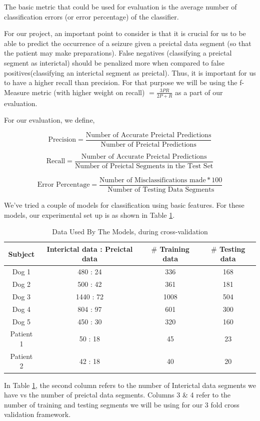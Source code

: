 \documentclass[a4paper]{article}
\begin{document}
The basic metric that could be used for evaluation is the average number of classification errors (or error percentage) of the classifier.

For our project, an important point to consider is that it is crucial for us to be able to predict the occurrence of a seizure given a preictal data segment (so that the patient may make preparations). False negatives (classifying a preictal segment as interictal) should be penalized more when compared to false positives(classifying an interictal segment as preictal). Thus, it is important for us to have a higher recall than precision. For that purpose we will be using the f-Measure metric (with higher weight on recall) $ = \frac{3PR}{2P + R} $ as a part of our evaluation.

For our evaluation, we define,

$$\text{Precision} = \frac{\text{Number of Accurate Preictal Predictions}}{\text{Number of Preictal Predictions}}$$

$$\text{Recall} = \frac{\text{Number of Accurate Preictal Predictions}}{\text{Number of Preictal Segments in the Test Set}}$$

$$\text{Error Percentage} = \frac{\text{Number of Misclassifications made} * 100}{\text{Number of Testing Data Segments}}$$

We've tried a couple of models for classification using basic features. For these models, our experimental set up is as shown in Table \ref{tab:data}.

\begin{table}[!htbp]
\centering
\begin{tabular}{*4c}
\toprule
Subject & Interictal data : Preictal data & $\#$ Training data & $\#$ Testing data\\
\midrule
Dog 1 & 480 : 24 & 336 & 168\\
Dog 2 & 500 : 42 & 361 & 181\\
Dog 3 & 1440 : 72 & 1008 & 504\\
Dog 4 & 804 : 97 & 601 & 300\\
Dog 5 & 450 : 30 & 320 & 160\\
Patient 1 & 50 : 18 & 45 & 23\\
Patient 2 & 42 : 18 & 40 & 20\\
\bottomrule
\end{tabular}
\caption{Data Used By The Models, during cross-validation}
\label{tab:data}
\end{table}

In Table \ref{tab:data}, the second column refers to the number of Interictal data segments we have vs the number of preictal data segments. Columns 3 \& 4 refer to the number of training and testing segments we will be using for our 3 fold cross validation framework.
\end{document}
